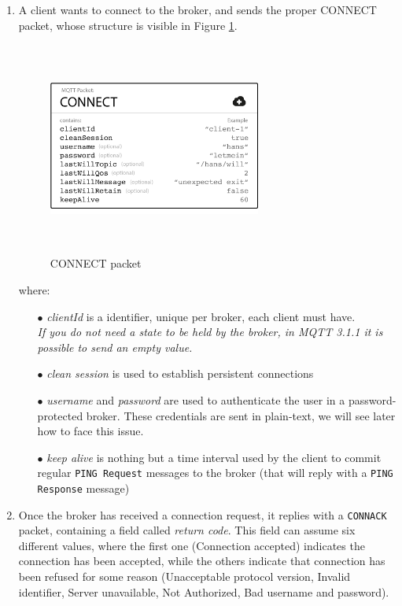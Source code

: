 \documentclass[12pt]{report}
\begin{document}
\begin{enumerate}
\setlength{\itemindent}{+5mm}
\item A client wants to connect to the broker, and sends the proper CONNECT packet, whose structure is visible in Figure \ref{fig:connectpacket}.

\begin{figure}[H]
\includegraphics[width=7cm,height=7cm,keepaspectratio]{connect_message}
\centering
\caption{CONNECT packet}
\label{fig:connectpacket}
\end{figure}
where:

\begin{itemize}
\setlength{\itemindent}{+4mm}
\item[$\bullet$] \emph{clientId} is a identifier, unique per broker, each client must have.\\
  \emph{If you do not need a state to be held by the broker, in MQTT 3.1.1 it is possible to send an empty value.}
  \item[$\bullet$] \emph{clean session} is used to establish persistent connections
  \item[$\bullet$] \emph{username} and \emph{password} are used to authenticate the user in a password-protected broker. These credentials are sent in plain-text, we will see later how to face this issue.
  \item[$\bullet$] \emph{keep alive} is nothing but a time interval used by the client to commit regular \texttt{PING Request} messages to the broker (that will reply with a \texttt{PING Response} message)
\end{itemize}

\item Once the broker has received a connection request, it replies with a \texttt{CONNACK} packet, containing a field called \emph{return code}. 
This field can assume six different values, where the first one (Connection accepted) indicates the connection has been accepted, while the others indicate that connection has been refused for some reason (Unacceptable protocol version, Invalid identifier, Server unavailable, Not Authorized, Bad username and password).


\end{enumerate}
\end{document}
